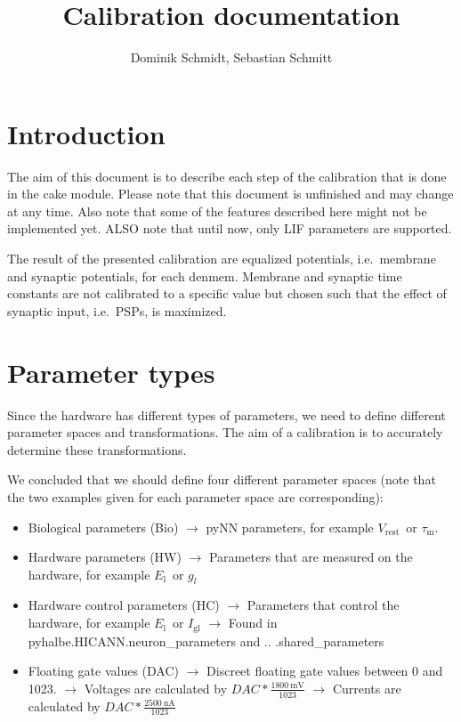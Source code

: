 \documentclass[12pt,a4paper,bibliography=totocnumbered,listof=totocnumbered, DIV12]{scrartcl}
\author{Dominik Schmidt, Sebastian Schmitt}
\title{Calibration documentation}
\newcommand{\el}{\ensuremath{E_{\text{l}}}}
\newcommand{\vrest}{\ensuremath{V_{\text{rest}}}}
\newcommand{\igl}{\ensuremath{I_{\text{gl}}}}
\newcommand{\taum}{\ensuremath{\tau_{\text{m}}}}
\begin{document}
\maketitle
\tableofcontents
\section{Introduction}
The aim of this document is to describe each step of the calibration that is done in the cake module.
Please note that this document is unfinished and may change at any time.
Also note that some of the features described here might not be implemented yet. 
ALSO note that until now, only LIF parameters are supported.

The result of the presented calibration are equalized potentials,
i.e.\ membrane and synaptic potentials, for each denmem.  Membrane and
synaptic time constants are not calibrated to a specific value but
chosen such that the effect of synaptic input, i.e.\ PSPs, is maximized.

\section{Parameter types}
Since the hardware has different types of parameters, we need to define different parameter spaces and transformations.
The aim of a calibration is to accurately determine these transformations.

We concluded that we should define four different parameter spaces (note that the two examples given for each parameter space are corresponding):
\begin{itemize}
\item Biological parameters (Bio)
\subitem $\rightarrow$ pyNN parameters, for example \vrest\ or \taum.
\item Hardware parameters (HW)
\subitem $\rightarrow$ Parameters that are measured on the hardware, for example \el\ or $g_l$
\item Hardware control parameters (HC)
\subitem $\rightarrow$ Parameters that control the hardware, for example \el\ or \igl
\subitem $\rightarrow$ Found in pyhalbe.HICANN.neuron\_parameters and .. .shared\_parameters
\item Floating gate values (DAC)
\subitem $\rightarrow$ Discreet floating gate values between 0 and 1023.
\subitem $\rightarrow$ Voltages are calculated by $DAC * \frac{\SI{1800}{\milli\volt}}{1023}$
\subitem $\rightarrow$ Currents are calculated by $DAC * \frac{\SI{2500}{\nano\ampere}}{1023}$
\end{itemize}
 
\end{document}
